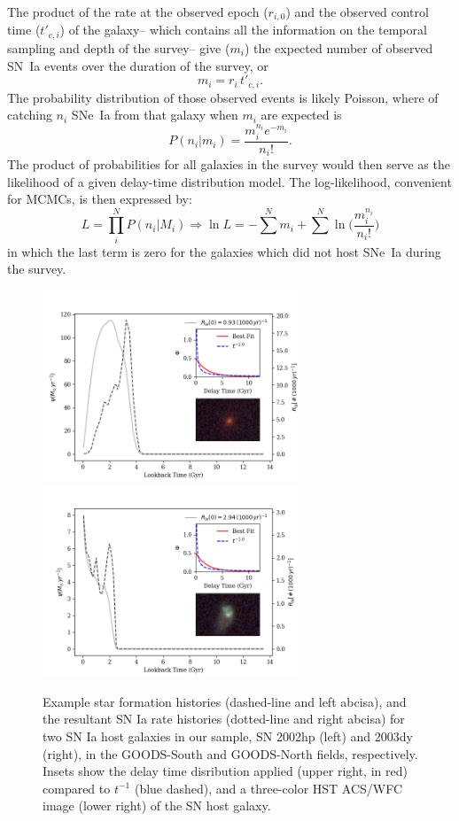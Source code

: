 \documentclass[apj]{aastex62}
\begin{document}
The product of the rate at the observed epoch ($r_{i,0}$) and the observed control time ($t'_{c, i}$) of the galaxy-- which contains all the information on the temporal sampling and depth of the survey--  give ($m_i$) the expected number of observed SN~Ia events over the duration of the survey, or
\begin{equation}
m_i = r_i \, t'_{c, i}.
\end{equation}
\noindent The probability distribution of those observed events is likely Poisson, where of catching $n_i$ SNe~Ia from that galaxy when $m_i$ are expected is
\begin{equation}
P(n_i | m_i) = \frac{m_i^{n_i}e^{-m_i}}{n_i!}.
\end{equation}
\noindent The product of probabilities for all galaxies in the survey would then serve as the likelihood of a given delay-time distribution model. The log-likelihood, convenient for MCMCs, is then expressed by:
\begin{equation}
L = \prod _i^N P(n_i|M_i) \Rightarrow \ln L = -\sum^N m_i+\sum^N\ln\biggl(\frac{m_i^{n_i}}{n_i!}\biggr)
\end{equation}
\noindent in which the last term is zero for the galaxies which did not host SNe~Ia during the survey.


\begin{figure}[t] %
   \centering
   \includegraphics[width=3in]{figure_sfh_demo_v1} 
   \includegraphics[width=3in]{figure_sfh_demo_v2} 
   \caption{\footnotesize Example star formation histories (dashed-line and left abcisa), and the resultant SN Ia rate histories (dotted-line and right abcisa) for two SN Ia host galaxies in our sample, SN 2002hp (left) and 2003dy (right), in the GOODS-South and GOODS-North fields, respectively. Insets show the delay time disribution applied (upper right, in red) compared to $t^{-1}$ (blue dashed), and a three-color HST ACS/WFC image (lower right) of the SN host galaxy.}
   \label{fig:figure_sfh_fit_demo}
\end{figure}
\end{document}

